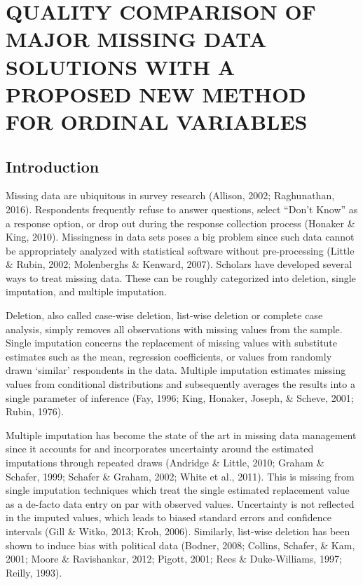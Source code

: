 \documentclass[12pt,econ]{sources/authesis}
\begin{document}
\hypertarget{ordmiss}{%
\chapter{QUALITY COMPARISON OF MAJOR MISSING DATA SOLUTIONS WITH A PROPOSED NEW METHOD FOR ORDINAL VARIABLES}\label{ordmiss}}

\hypertarget{ordmiss-intro}{%
\section{Introduction}\label{ordmiss-intro}}

Missing data are ubiquitous in survey research (Allison, 2002; Raghunathan, 2016). Respondents frequently refuse to answer questions, select ``Don't Know'' as a response option, or drop out during the response collection process (Honaker \& King, 2010). Missingness in data sets poses a big problem since such data cannot be appropriately analyzed with statistical software without pre-processing (Little \& Rubin, 2002; Molenberghs \& Kenward, 2007). Scholars have developed several ways to treat missing data. These can be roughly categorized into deletion, single imputation, and multiple imputation.

Deletion, also called case-wise deletion, list-wise deletion or complete case analysis, simply removes all observations with missing values from the sample. Single imputation concerns the replacement of missing values with substitute estimates such as the mean, regression coefficients, or values from randomly drawn `similar' respondents in the data. Multiple imputation estimates missing values from conditional distributions and subsequently averages the results into a single parameter of inference (Fay, 1996; King, Honaker, Joseph, \& Scheve, 2001; Rubin, 1976).

Multiple imputation has become the state of the art in missing data management since it accounts for and incorporates uncertainty around the estimated imputations through repeated draws (Andridge \& Little, 2010; Graham \& Schafer, 1999; Schafer \& Graham, 2002; White et al., 2011). This is missing from single imputation techniques which treat the single estimated replacement value as a de-facto data entry on par with observed values. Uncertainty is not reflected in the imputed values, which leads to biased standard errors and confidence intervals (Gill \& Witko, 2013; Kroh, 2006). Similarly, list-wise deletion has been shown to induce bias with political data (Bodner, 2008; Collins, Schafer, \& Kam, 2001; Moore \& Ravishankar, 2012; Pigott, 2001; Rees \& Duke-Williams, 1997; Reilly, 1993).
\end{document}
